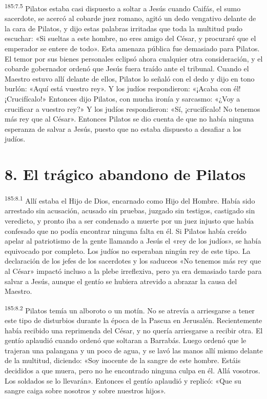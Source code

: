 \par 
\textsuperscript{185:7.5} Pilatos estaba casi dispuesto a soltar a Jesús cuando Caifás, el sumo sacerdote, se acercó al cobarde juez romano, agitó un dedo vengativo delante de la cara de Pilatos, y dijo estas palabras irritadas que toda la multitud pudo escuchar: «Si sueltas a este hombre, no eres amigo del César, y procuraré que el emperador se entere de todo». Esta amenaza pública fue demasiado para Pilatos. El temor por sus bienes personales eclipsó ahora cualquier otra consideración, y el cobarde gobernador ordenó que Jesús fuera traído ante el tribunal. Cuando el Maestro estuvo allí delante de ellos, Pilatos lo señaló con el dedo y dijo en tono burlón: «Aquí está vuestro rey». Y los judíos respondieron: «¡Acaba con él! ¡Crucifícalo!» Entonces dijo Pilatos, con mucha ironía y sarcasmo: «¿Voy a crucificar a vuestro rey?» Y los judíos respondieron: «Sí, ¡crucifícalo! No tenemos más rey que al César». Entonces Pilatos se dio cuenta de que no había ninguna esperanza de salvar a Jesús, puesto que no estaba dispuesto a desafiar a los judíos.

\section*{8. El trágico abandono de Pilatos}
\par 
\textsuperscript{185:8.1} Allí estaba el Hijo de Dios, encarnado como Hijo del Hombre. Había sido arrestado sin acusación, acusado sin pruebas, juzgado sin testigos, castigado sin veredicto, y pronto iba a ser condenado a muerte por un juez injusto que había confesado que no podía encontrar ninguna falta en él. Si Pilatos había creído apelar al patriotismo de la gente llamando a Jesús el «rey de los judíos», se había equivocado por completo. Los judíos no esperaban ningún rey de este tipo. La declaración de los jefes de los sacerdotes y los saduceos «No tenemos más rey que al César» impactó incluso a la plebe irreflexiva, pero ya era demasiado tarde para salvar a Jesús, aunque el gentío se hubiera atrevido a abrazar la causa del Maestro.

\par 
\textsuperscript{185:8.2} Pilatos temía un alboroto o un motín. No se atrevía a arriesgarse a tener este tipo de disturbios durante la época de la Pascua en Jerusalén. Recientemente había recibido una reprimenda del César, y no quería arriesgarse a recibir otra. El gentío aplaudió cuando ordenó que soltaran a Barrabás. Luego ordenó que le trajeran una palangana y un poco de agua, y se lavó las manos allí mismo delante de la multitud, diciendo: «Soy inocente de la sangre de este hombre. Estáis decididos a que muera, pero no he encontrado ninguna culpa en él. Allá vosotros. Los soldados se lo llevarán». Entonces el gentío aplaudió y replicó: «Que su sangre caiga sobre nosotros y sobre nuestros hijos».
